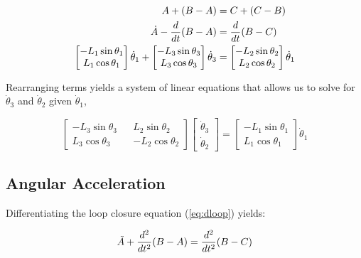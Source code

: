 \documentclass[letterpaper]{article}
\begin{document}
\begin{align}
	A + (B - A) &= C + (C - B) \notag \\
	\dot{A} - \frac{d}{dt} (B - A) &= \frac{d}{dt} ( B - C) \label{eq:dloop}\\
	\begin{bmatrix} -L_1 \sin \theta_1 \\ L_1 \cos \theta_1 \end{bmatrix} \dot{\theta}_1 + \begin{bmatrix} -L_3 \sin \theta_3 \\ L_3 \cos \theta_3 \end{bmatrix} \dot{\theta}_3 &= \begin{bmatrix} -L_2 \sin \theta_2 \\ L_2 \cos \theta_2 \end{bmatrix} \dot{\theta}_1 \notag
	\end{align}

\noindent Rearranging terms yields a system of linear equations that allows us to solve for $\dot{\theta}_3$ and $\dot{\theta}_2$ given $\dot{\theta}_1$,

\begin{equation}
	\begin{bmatrix} -L_3 \sin \theta_3 && L_2 \sin \theta_2 \\ L_3 \cos \theta_3 && - L_2 \cos \theta_2 \end{bmatrix} \begin{bmatrix} \dot{\theta}_3 \\ \dot{\theta}_2 \end{bmatrix} = \begin{bmatrix} -L_1 \sin \theta_1 \\ L_1 \cos \theta_1 \end{bmatrix} \dot{\theta}_1
\end{equation}

\subsection{Angular Acceleration}

Differentiating the loop closure equation (\ref{eq:dloop}) yields:

\begin{equation}
	\ddot{A} + \frac{d^2}{dt^2} (B -A) = \frac{d^2}{dt^2} (B - C) \\
\end{equation}
\end{document}
